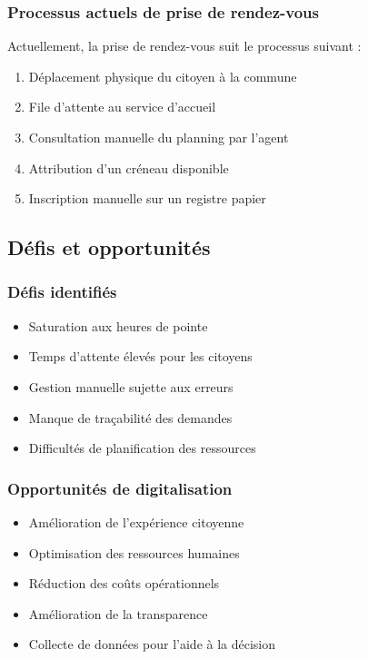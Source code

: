 \subsubsection{Processus actuels de prise de rendez-vous}

Actuellement, la prise de rendez-vous suit le processus suivant :
\begin{enumerate}
    \item Déplacement physique du citoyen à la commune
    \item File d'attente au service d'accueil
    \item Consultation manuelle du planning par l'agent
    \item Attribution d'un créneau disponible
    \item Inscription manuelle sur un registre papier
\end{enumerate}

\subsection{Défis et opportunités}

\subsubsection{Défis identifiés}
\begin{itemize}
    \item Saturation aux heures de pointe
    \item Temps d'attente élevés pour les citoyens
    \item Gestion manuelle sujette aux erreurs
    \item Manque de traçabilité des demandes
    \item Difficultés de planification des ressources
\end{itemize}

\subsubsection{Opportunités de digitalisation}
\begin{itemize}
    \item Amélioration de l'expérience citoyenne
    \item Optimisation des ressources humaines
    \item Réduction des coûts opérationnels
    \item Amélioration de la transparence
    \item Collecte de données pour l'aide à la décision
\end{itemize}

